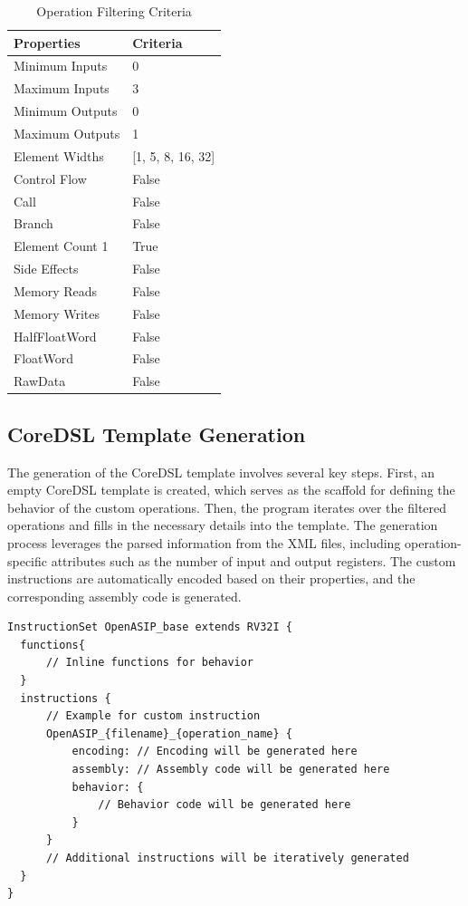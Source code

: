\begin{table}[hb]
    \centering
    \caption{Operation Filtering Criteria}
    \label{tab:filtercriteria}
    \begin{tabular}{@{}ll@{}}
    \toprule
    \textbf{Properties} & \textbf{Criteria} \\ \midrule
    Minimum Inputs & 0 \\
    Maximum Inputs & 3 \\
    Minimum Outputs & 0 \\
    Maximum Outputs & 1 \\
    Element Widths & [1, 5, 8, 16, 32] \\
    Control Flow & False \\
    Call & False \\
    Branch & False \\
    Element Count 1 & True \\
    Side Effects & False \\
    Memory Reads & False \\
    Memory Writes & False \\
    HalfFloatWord & False \\
    FloatWord & False \\
    RawData & False \\ \bottomrule
    \end{tabular}
\end{table}

\subsection{CoreDSL Template Generation}

The generation of the CoreDSL template involves several key steps. First, an empty CoreDSL template is created, which serves as the scaffold for defining the behavior of the custom operations. Then, the program iterates over the filtered operations and fills in the necessary details into the template. The generation process leverages the parsed information from the XML files, including operation-specific attributes such as the number of input and output registers. The custom instructions are automatically encoded based on their properties, and the corresponding assembly code is generated.

\begin{lstlisting}[caption={CoreDSL Template},captionpos=b]
InstructionSet OpenASIP_base extends RV32I {
  functions{
      // Inline functions for behavior
  }
  instructions {
      // Example for custom instruction
      OpenASIP_{filename}_{operation_name} {
          encoding: // Encoding will be generated here
          assembly: // Assembly code will be generated here
          behavior: {
              // Behavior code will be generated here
          }
      }
      // Additional instructions will be iteratively generated
  }
}
\end{lstlisting}

